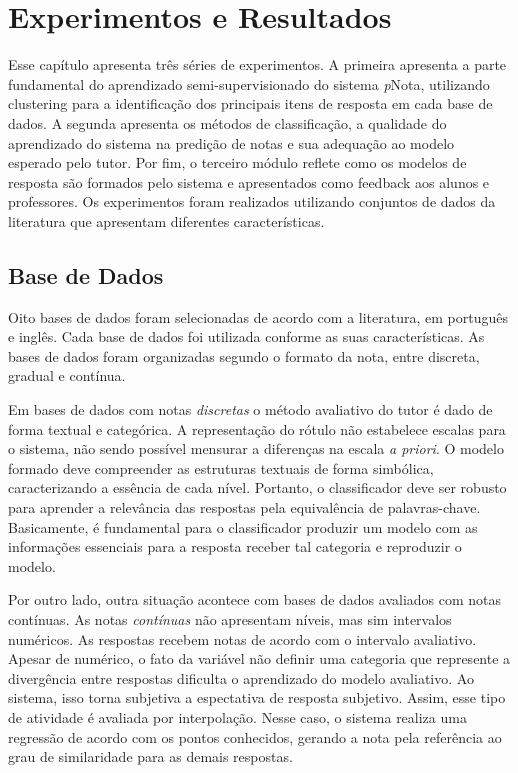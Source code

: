 \chapter{Experimentos e Resultados}
\label{cap-experimentos}
Esse capítulo apresenta três séries de experimentos. A primeira apresenta a parte fundamental do aprendizado semi-supervisionado do sistema \textit{p}Nota, utilizando clustering para a identificação dos principais itens de resposta em cada base de dados. A segunda apresenta os métodos de classificação, a qualidade do aprendizado do sistema na predição de notas e sua adequação ao modelo esperado pelo tutor. Por fim, o terceiro módulo reflete como os modelos de resposta são formados pelo sistema e apresentados como feedback aos alunos e professores. Os experimentos foram realizados utilizando conjuntos de dados da literatura que apresentam diferentes características.

\section{Base de Dados}
Oito bases de dados foram selecionadas de acordo com a literatura, em português e inglês. Cada base de dados foi utilizada conforme as suas características. As bases de dados foram organizadas segundo o formato da nota, entre discreta, gradual e contínua.

Em bases de dados com notas \textit{discretas} o método avaliativo do tutor é dado de forma textual e categórica. A representação do rótulo não estabelece escalas para o sistema, não sendo possível mensurar a diferenças na escala \textit{a priori}. O modelo formado deve compreender as estruturas textuais de forma simbólica, caracterizando a essência de cada nível. Portanto, o classificador deve ser robusto para aprender a relevância das respostas pela equivalência de palavras-chave. Basicamente, é fundamental para o classificador produzir um modelo com as informações essenciais para a resposta receber tal categoria e reproduzir o modelo.

Por outro lado, outra situação acontece com bases de dados avaliados com notas contínuas. As notas \textit{contínuas} não apresentam níveis, mas sim intervalos numéricos. As respostas recebem notas de acordo com o intervalo avaliativo. Apesar de numérico, o fato da variável não definir uma categoria que represente a divergência entre respostas dificulta o aprendizado do modelo avaliativo. Ao sistema, isso torna subjetiva a espectativa de resposta subjetivo. Assim, esse tipo de atividade é avaliada por interpolação. Nesse caso, o sistema realiza uma regressão de acordo com os pontos conhecidos, gerando a nota pela referência ao grau de similaridade para as demais respostas.

